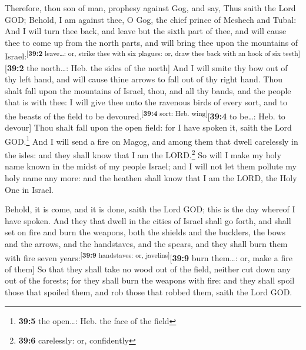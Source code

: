  Therefore, thou son of man, prophesy against Gog, and
say, Thus saith the Lord GOD; Behold, I am against thee, O Gog, the
chief prince of Meshech and Tubal:  And I will turn thee
back, and leave but the sixth part of thee, and will cause thee to come
up from the north parts, and will bring thee upon the mountains of
Israel:\textsuperscript{{[}\textbf{39:2} leave\ldots: or, strike thee
with six plagues: or, draw thee back with an hook of six
teeth{]}}{[}\textbf{39:2} the north\ldots: Heb. the sides of the
north{]}  And I will smite thy bow out of thy left hand,
and will cause thine arrows to fall out of thy right hand.
 Thou shalt fall upon the mountains of Israel, thou, and
all thy bands, and the people that is with thee: I will give thee unto
the ravenous birds of every sort, and to the beasts of the field to be
devoured.\textsuperscript{{[}\textbf{39:4} sort: Heb.
wing{]}}{[}\textbf{39:4} to be\ldots: Heb. to devour{]} 
Thou shalt fall upon the open field: for I have spoken it, saith the
Lord GOD.\footnote{\textbf{39:5} the open\ldots: Heb. the face of the
  field}  And I will send a fire on Magog, and among them
that dwell carelessly in the isles: and they shall know that I am the
LORD.\footnote{\textbf{39:6} carelessly: or, confidently} 
So will I make my holy name known in the midst of my people Israel; and
I will not let them pollute my holy name any more: and the heathen shall
know that I am the LORD, the Holy One in Israel.

 Behold, it is come, and it is done, saith the Lord GOD;
this is the day whereof I have spoken.  And they that
dwell in the cities of Israel shall go forth, and shall set on fire and
burn the weapons, both the shields and the bucklers, the bows and the
arrows, and the handstaves, and the spears, and they shall burn them
with fire seven years:\textsuperscript{{[}\textbf{39:9} handstaves: or,
javelins{]}}{[}\textbf{39:9} burn them\ldots: or, make a fire of them{]}
 So that they shall take no wood out of the field,
neither cut down any out of the forests; for they shall burn the weapons
with fire: and they shall spoil those that spoiled them, and rob those
that robbed them, saith the Lord GOD.

